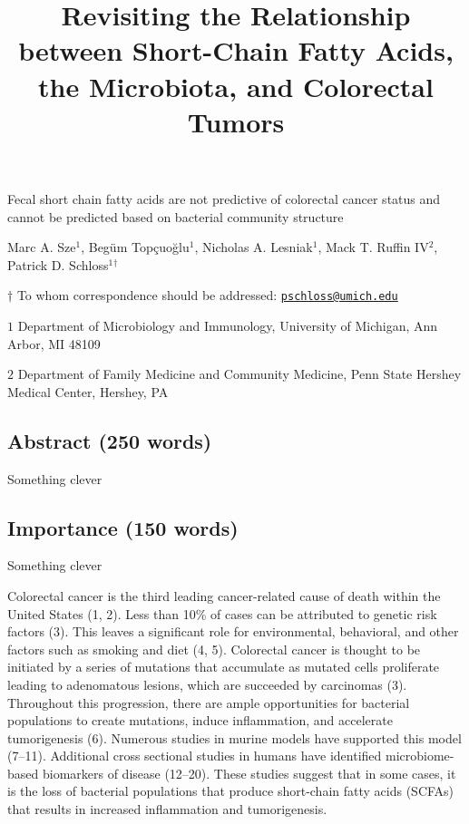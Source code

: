 \documentclass[11pt,]{article}
\title{Revisiting the Relationship between Short-Chain Fatty Acids, the
Microbiota, and Colorectal Tumors}
\author{}
\date{}
\begin{document}
\maketitle

\vspace{35mm}

Fecal short chain fatty acids are not predictive of colorectal cancer
status and cannot be predicted based on bacterial community structure

\vspace{35mm}

Marc A. Sze\({^1}\), Begüm Topçuoğlu\({^1}\), Nicholas A.
Lesniak\({^1}\), Mack T. Ruffin IV\({^2}\), Patrick D.
Schloss\({^1}\)\({^\dagger}\)

\vspace{40mm}

\(\dagger\) To whom correspondence should be addressed:
\href{mailto:pschloss@umich.edu}{\nolinkurl{pschloss@umich.edu}}

\(1\) Department of Microbiology and Immunology, University of Michigan,
Ann Arbor, MI 48109

\(2\) Department of Family Medicine and Community Medicine, Penn State
Hershey Medical Center, Hershey, PA

\newpage
\linenumbers

\hypertarget{abstract-250-words}{%
\subsection{Abstract (250 words)}\label{abstract-250-words}}

Something clever

\hypertarget{importance-150-words}{%
\subsection{Importance (150 words)}\label{importance-150-words}}

Something clever

\newpage

Colorectal cancer is the third leading cancer-related cause of death
within the United States (1, 2). Less than 10\% of cases can be
attributed to genetic risk factors (3). This leaves a significant role
for environmental, behavioral, and other factors such as smoking and
diet (4, 5). Colorectal cancer is thought to be initiated by a series of
mutations that accumulate as mutated cells proliferate leading to
adenomatous lesions, which are succeeded by carcinomas (3). Throughout
this progression, there are ample opportunities for bacterial
populations to create mutations, induce inflammation, and accelerate
tumorigenesis (6). Numerous studies in murine models have supported this
model (7--11). Additional cross sectional studies in humans have
identified microbiome-based biomarkers of disease (12--20). These
studies suggest that in some cases, it is the loss of bacterial
populations that produce short-chain fatty acids (SCFAs) that results in
increased inflammation and tumorigenesis.
\end{document}
